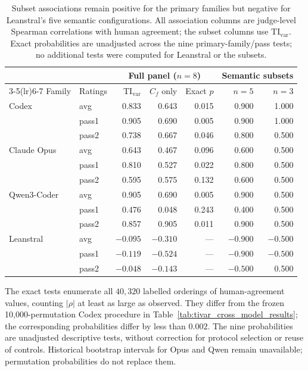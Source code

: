 \begin{table}[htbp]
\centering\small
\begin{tabular}{@{}llrrrrr@{}}
\toprule
& & \multicolumn{3}{c}{Full panel ($n=8$)} & \multicolumn{2}{c}{Semantic subsets} \\
\cmidrule(lr){3-5}\cmidrule(lr){6-7}
Family & Ratings & $\mathrm{TI}_{\mathrm{var}}$ & $C_f$ only & Exact $p$ & $n=5$ & $n=3$ \\
\midrule
Codex & avg & 0.833 & 0.643 & 0.015 & 0.900 & 1.000 \\
& pass1 & 0.905 & 0.690 & 0.005 & 0.900 & 1.000 \\
& pass2 & 0.738 & 0.667 & 0.046 & 0.800 & 0.500 \\
Claude Opus & avg & 0.643 & 0.467 & 0.096 & 0.600 & 0.500 \\
& pass1 & 0.810 & 0.527 & 0.022 & 0.800 & 0.500 \\
& pass2 & 0.595 & 0.575 & 0.132 & 0.600 & 0.500 \\
Qwen3-Coder & avg & 0.905 & 0.690 & 0.005 & 0.900 & 0.500 \\
& pass1 & 0.476 & 0.048 & 0.243 & 0.400 & 0.500 \\
& pass2 & 0.857 & 0.905 & 0.011 & 0.900 & 0.500 \\
\midrule
Leanstral & avg & $-0.095$ & $-0.310$ & --- & $-0.900$ & $-0.500$ \\
& pass1 & $-0.119$ & $-0.524$ & --- & $-0.900$ & $-0.500$ \\
& pass2 & $-0.048$ & $-0.143$ & --- & $-0.500$ & 0.500 \\
\bottomrule
\end{tabular}
\caption{Subset associations remain positive for the primary families but negative for Leanstral's five semantic configurations.
All association columns are judge-level Spearman correlations with human agreement; the subset columns use $\mathrm{TI}_{\mathrm{var}}$.
Exact probabilities are unadjusted across the nine primary-family/pass tests; no additional tests were computed for Leanstral or the subsets.}
\label{tab:subset-diagnostics}\label{tab:judge-level-diagnostics}
\end{table}

The exact tests enumerate all $40{,}320$ labelled orderings of human-agreement values, counting $|\rho|$ at least as large as observed.
They differ from the frozen 10{,}000-permutation Codex procedure in Table~\ref{tab:tivar_cross_model_results}; the corresponding probabilities differ by less than $0.002$.
The nine probabilities are unadjusted descriptive tests, without correction for protocol selection or reuse of controls.
Historical bootstrap intervals for Opus and Qwen remain unavailable; permutation probabilities do not replace them.

